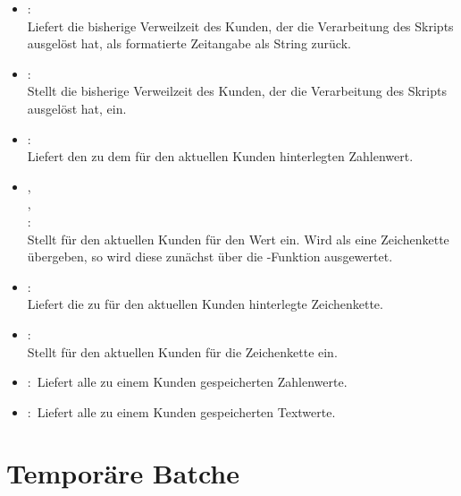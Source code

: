 \begin{itemize}
\item
{}:\\
Liefert die bisherige Verweilzeit des Kunden, der die Verarbeitung des Skripts ausgelöst hat, als formatierte Zeitangabe als String zurück.

\item
{}:\\
Stellt die bisherige Verweilzeit des Kunden, der die Verarbeitung des Skripts ausgelöst hat, ein.

\item
{}:\\
Liefert den zu dem  für den aktuellen Kunden hinterlegten Zahlenwert.
  
\item
{},\\
,\\
:\\
Stellt für den aktuellen Kunden für  den Wert  ein.
Wird als  eine Zeichenkette übergeben, so wird diese zunächst über die
-Funktion ausgewertet.
  
\item
{}:\\
Liefert die zu  für den aktuellen Kunden hinterlegte Zeichenkette.
  
\item
{}:\\
Stellt für den aktuellen Kunden für  die Zeichenkette  ein.

\item
{}:\
Liefert alle zu einem Kunden gespeicherten Zahlenwerte.
  
\item
{}:\
Liefert alle zu einem Kunden gespeicherten Textwerte.
	
\end{itemize}

\section{Temporäre Batche}

